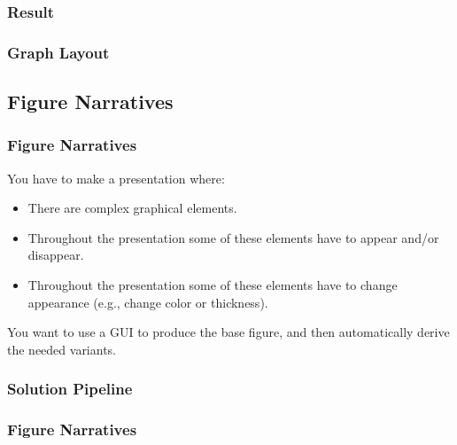 {\subsubsection{Result}
\begin{frame}[fragile]
  \frametitle{Graph Layout }
  \pause
  \vspace{12mm}
  
\end{frame}

\subsection{Figure Narratives}
\begin{frame}[fragile]
  \frametitle{Figure Narratives}
  \pause
  \vspace{3mm}
  You have to make a presentation where:
  \begin{itemize}
    \item There are complex graphical elements.
    \item Throughout the presentation some of these elements have to appear and/or disappear.
    \item Throughout the presentation some of these elements have to change appearance (e.g., change color or thickness).
  \end{itemize}
  
  \vspace{5mm}
  You want to use a GUI to produce the base figure, and then automatically derive the needed variants.
\end{frame}

\subsubsection{Solution Pipeline}
\begin{frame}[fragile]
  \frametitle{Figure Narratives }
  \vspace{7mm}
  \begin{center}
\end{center}
\end{frame}}
